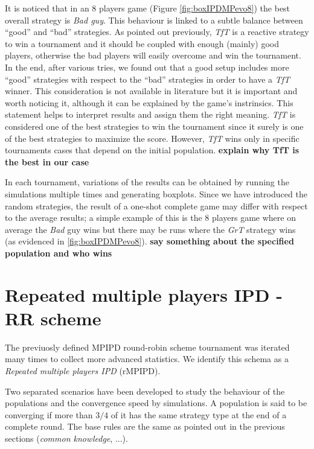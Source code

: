 \documentclass[journal,a4paper,10pt,twoside]{IEEEtran} %
\begin{document}
It is noticed that in an 8 players game (Figure \ref{fig:boxIPDMPevo8}) the best overall strategy is \textit{Bad guy}. This behaviour is linked to a subtle balance between ``good'' and ``bad'' strategies. As pointed out previously, \textit{TfT} is a reactive strategy to win a tournament and it should be coupled with enough (mainly) good players, otherwise the bad players will easily overcome and win the tournament. In the end, after various tries, we found out that a good setup includes more ``good'' strategies with respect to the ``bad'' strategies in order to have a \textit{TfT} winner. This consideration is not available in literature but it is important and worth noticing it, although it can be explained by the game's instrinsics. This statement helps to interpret results and assign them the right meaning. \textit{TfT} is considered one of the best strategies to win the tournament since it surely is one of the best strategies to maximize the score. However, \textit{TfT} wins only in specific tournaments cases that depend on the initial population.
\textbf{explain why TfT is the best in our case}

In each tournament, variations of the results can be obtained by running the simulations multiple times and generating boxplots.
Since we have introduced the random strategies, the result of a one-shot complete game may differ with respect to the average results; a simple example of this is the 8 players game where on average the \textit{Bad} guy wins but there may be runs where the \textit{GrT} strategy wins (as evidenced in \autoref{fig:boxIPDMPevo8}).
\textbf{say something about the specified population and who wins}

\section{Repeated multiple players IPD - RR scheme} \label{s:rIPDMP}
The previuosly defined MPIPD round-robin scheme tournament was iterated many times to collect more advanced statistics.
We identify this schema as a \textit{Repeated multiple players IPD} (rMPIPD).

Two separated scenarios have been developed to study the behaviour of the populations and the convergence speed by simulations. A population is said to be converging if more than $3/4$ of it has the same strategy type at the end of a complete round. The base rules are the same as pointed out in the previous sections (\textit{common knowledge}, ...).
\end{document}
